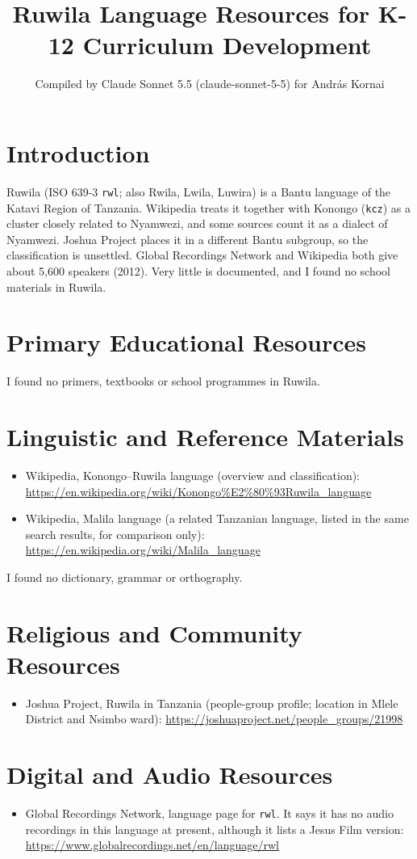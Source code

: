 \documentclass[12pt]{article}
\title{Ruwila Language Resources for K-12 Curriculum Development}
\author{Compiled by Claude Sonnet 5.5 (claude-sonnet-5-5) for Andr\'as Kornai}
\date{}
\begin{document}
\maketitle

\section{Introduction}
Ruwila (ISO 639-3 \texttt{rwl}; also Rwila, Lwila, Luwira) is a Bantu language of the Katavi Region of Tanzania. Wikipedia treats it together with Konongo (\texttt{kcz}) as a cluster closely related to Nyamwezi, and some sources count it as a dialect of Nyamwezi. Joshua Project places it in a different Bantu subgroup, so the classification is unsettled. Global Recordings Network and Wikipedia both give about 5,600 speakers (2012). Very little is documented, and I found no school materials in Ruwila.

\section{Primary Educational Resources}
I found no primers, textbooks or school programmes in Ruwila.

\section{Linguistic and Reference Materials}
\begin{itemize}
\item Wikipedia, Konongo--Ruwila language (overview and classification): \url{https://en.wikipedia.org/wiki/Konongo%E2%80%93Ruwila_language}
\item Wikipedia, Malila language (a related Tanzanian language, listed in the same search results, for comparison only): \url{https://en.wikipedia.org/wiki/Malila_language}
\end{itemize}
I found no dictionary, grammar or orthography.

\section{Religious and Community Resources}
\begin{itemize}
\item Joshua Project, Ruwila in Tanzania (people-group profile; location in Mlele District and Nsimbo ward): \url{https://joshuaproject.net/people_groups/21998}
\end{itemize}

\section{Digital and Audio Resources}
\begin{itemize}
\item Global Recordings Network, language page for \texttt{rwl}. It says it has no audio recordings in this language at present, although it lists a Jesus Film version: \url{https://www.globalrecordings.net/en/language/rwl}
\end{itemize}
\end{document}
